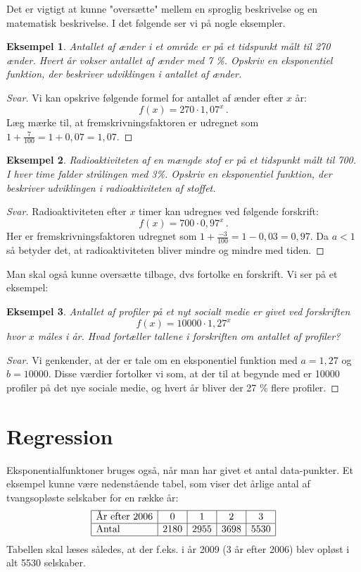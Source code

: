\documentclass[12pt,oneside,a4paper]{article}
\theoremstyle{plain}
\newtheorem*{eks}{Eksempel}
\begin{document}
Det er vigtigt at kunne "oversætte" mellem en sproglig beskrivelse og en matematisk beskrivelse.
I det følgende ser vi på nogle eksempler.

\begin{eks}
    Antallet af ænder i et område er på et tidspunkt målt til 270 ænder. Hvert
    år vokser antallet af ænder med 7 \%. Opskriv en eksponentiel funktion, der
    beskriver udviklingen i antallet af ænder.
\end{eks}
\begin{proof}[Svar]
    Vi kan opskrive følgende formel for antallet af ænder efter $x$ år:
    $$
    f(x) = 270 \cdot 1,07^x\,.
    $$
    Læg mærke til, at fremskrivningsfaktoren er udregnet som $1+\frac{7}{100} =
    1+0,07 = 1,07$.
\end{proof}

\begin{eks}
    Radioaktiviteten af en mængde stof er på et tidspunkt målt til 700. I
    hver time falder strålingen med 3\%. Opskriv en eksponentiel funktion,
    der beskriver udviklingen i radioaktiviteten af stoffet.
\end{eks}
\begin{proof}[Svar]
    Radioaktiviteten efter $x$ timer kan udregnes ved følgende forskrift:
    $$
    f(x) = 700 \cdot 0,97^x\,.
    $$
    Her er fremskrivningsfaktoren udregnet som $1 + \frac{-3}{100} = 1-0,03 = 0,97$.
    Da $a<1$ så betyder det, at radioaktiviteten bliver mindre og mindre med tiden.
\end{proof}

Man skal også kunne oversætte tilbage, dvs fortolke en forskrift. Vi ser på et eksempel:

\begin{eks}
    Antallet af profiler på et nyt socialt medie er givet ved forskriften
    $$
    f(x) = 10000 \cdot 1,27^x
    $$
    hvor $x$ måles i år. Hvad fortæller tallene i forskriften om antallet af
    profiler?
\end{eks}
\begin{proof}[Svar]
    Vi genkender, at der er tale om en eksponentiel funktion med $a=1,27$ og
    $b=10000$.  Disse værdier fortolker vi som, at der til at begynde med er
    10000 profiler på det nye sociale medie, og hvert år bliver der 27 \% flere
    profiler.
\end{proof}

\section*{Regression}
Eksponentialfunktoner bruges også, når man har givet et antal
data-punkter. Et eksempel kunne være nedenstående tabel, som viser det årlige
antal af tvangsopløste selskaber for en række år:
$$
\begin{array}{|l|c|c|c|c|}
    \hline
    \mbox{År efter 2006} & 0 & 1 & 2 & 3 \\
    \hline
    \mbox{Antal} & 2180 & 2955 & 3698 & 5530 \\
    \hline
\end{array}
$$
Tabellen skal læses således, at der f.eks. i år 2009 (3 år efter 2006) blev
opløst i alt 5530 selskaber.
\end{document}
